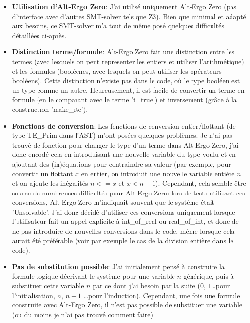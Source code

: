 \documentclass[a4paper]{article}%
\begin{document}
	\begin{itemize}
		\item \textbf{Utilisation d'Alt-Ergo Zero}: J'ai utilisé uniquement Alt-Ergo Zero (pas d'interface avec d'autres SMT-solver tels que Z3).
		Bien que minimal et adapté aux besoins, ce SMT-solver m'a tout de même posé quelques difficultés détaillées ci-après.\\
		\item \textbf{Distinction terme/formule}: Alt-Ergo Zero fait une distinction entre les termes (avec lesquels on peut representer les entiers
		et utiliser l'arithmétique) et les formules (booléenes, avec lesquels on peut utiliser les opérateurs booléens).
		Cette distinction n'existe pas dans le code, où le type booléen est un type comme un autre.
		Heureusement, il est facile de convertir un terme en formule (en le comparant avec le terme 't\_true') et inversement (grâce à la construction 'make\_ite').\\
		\item \textbf{Fonctions de conversion}: Les fonctions de conversion entier/flottant (de type TE\_Prim dans l'AST) m'ont posées quelques problèmes.
		Je n'ai pas trouvé de fonction pour changer le type d'un terme dans Alt-Ergo Zero, j'ai donc encodé cela en introduisant une nouvelle variable du type voulu
		et en ajoutant des (in)équations pour contraindre sa valeur (par exemple, pour convertir un flottant $x$ en entier, on introduit une nouvelle
		variable entière $n$ et on ajoute les inégalités $n <= x$ et $x < n+1$). Cependant, cela semble être source de nombreuses difficultés pour Alt-Ergo Zero:
		lors de tests utilisant ces conversions, Alt-Ergo Zero m'indiquait souvent que le système était 'Unsolvable'.
		J'ai donc décidé d'utiliser ces conversions uniquement lorsque l'utilisateur fait un appel explicite à int\_of\_real ou real\_of\_int, et donc de ne pas introduire
		de nouvelles conversions dans le code, même lorsque cela aurait été préférable (voir par exemple le cas de la division entière dans le code).\\
		\item \textbf{Pas de substitution possible}: J'ai initialement pensé à construire la formule logique décrivant le système pour une variable $n$ générique,
		puis à substituer cette variable $n$ par ce dont j'ai besoin par la suite ($0$, $1$\dots pour l'initialisation, $n$, $n+1$ \ldots pour l'induction).
		Cependant, une fois une formule construite avec Alt-Ergo Zero, il n'est pas possible de substituer une variable (ou du moins je n'ai pas trouvé comment faire).

\end{itemize}
\end{document}

